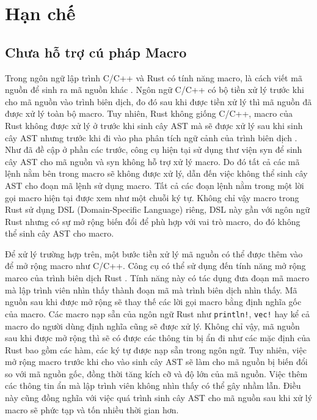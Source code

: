 \section{Hạn chế}

\subsection{Chưa hỗ trợ cú pháp Macro}

Trong ngôn ngữ lập trình C/C++ và Rust có tính năng macro, là cách viết mã nguồn để sinh ra mã nguồn khác \cite{rustlangMacrosRust}.
Ngôn ngữ C/C++ có bộ tiền xử lý trước khi cho mã nguồn vào trình biên dịch, đo đó sau khi được tiền xử lý thì mã nguồn đã được xử lý toàn bộ macro.
Tuy nhiên, Rust không giống C/C++, macro của Rust không được xử lý ở trước khi sinh cây AST mà sẽ được xử lý sau khi sinh cây AST nhưng trước khi đi vào pha phân tích ngữ cảnh của trình biên dịch \cite{veykrilSourceAnalysis}.
Như đã đề cập ở phần các trước, công cụ hiện tại sử dụng thư viện syn để sinh cây AST cho mã nguồn và syn không hỗ trợ xử lý macro.
Do đó tất cả các mã lệnh nằm bên trong macro sẽ không được xử lý, dẫn đến việc không thể sinh cây AST cho đoạn mã lệnh sử dụng macro.
Tất cả các đoạn lệnh nằm trong một lời gọi macro hiện tại được xem như một chuỗi ký tự.
Không chỉ vậy macro trong Rust sử dụng DSL (Domain-Specific Language) riêng, DSL này gần với ngôn ngữ Rust nhưng có sự mở rộng biến đổi để phù hợp với vai trò macro, do đó không thể sinh cây AST cho macro.

Để xử lý trường hợp trên, một bước tiền xử lý mã nguồn có thể được thêm vào để mở rộng macro như C/C++.
Công cụ có thể sử dụng đến tính năng mở rộng marco của trình biên dịch Rust \cite{rustlangMacroExpansion}.
Tính năng này có tác dụng đưa đoạn mã macro mà lập trình viên nhìn thấy thành đoạn mã mà trình biên dịch nhìn thấy.
Mã nguồn sau khi được mở rộng sẽ thay thế các lời gọi macro bằng định nghĩa gốc của macro.
Các macro nạp sẵn của ngôn ngữ Rust như \texttt{println!}, \texttt{vec!} hay kể cả macro do người dùng định nghĩa cũng sẽ được xử lý.
Không chỉ vậy, mã nguồn sau khi được mở rộng thì sẽ có được các thông tin bị ẩn đi như các mặc định của Rust bao gồm các hàm, các ký tự được nạp sẵn trong ngôn ngữ.
Tuy nhiên, việc mở rộng macro trước khi cho vào sinh cây AST sẽ làm cho mã nguồn bị biến đổi so với mã nguồn gốc, đồng thời tăng kích cỡ và độ lớn của mã nguồn.
Việc thêm các thông tin ẩn mà lập trình viên không nhìn thấy có thể gây nhầm lẫn.
Điều này cũng đồng nghĩa với việc quá trình sinh cây AST cho mã nguồn sau khi xử lý macro sẽ phức tạp và tốn nhiều thời gian hơn.

